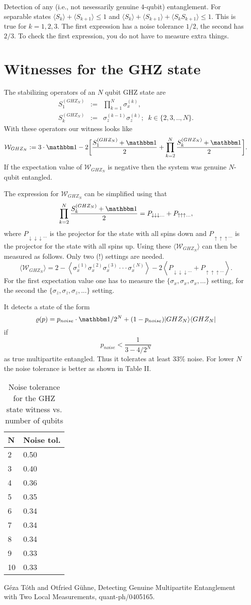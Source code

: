 \documentclass[amsmath,amssymb]{revtex4}
\newcommand{\be}{\begin{equation}}
\newcommand{\ee}{\end{equation}}
\newcommand{\eea}{\end{eqnarray}}
\newcommand{\bea}{\begin{eqnarray}}
\newcommand{\ex}[1]{\ensuremath{\left\langle{#1}\right\rangle}}
\newcommand{\exs}[1]{\ensuremath{\langle{#1}\rangle}}
\newcommand{\eins}{\ensuremath{\mathbbm 1}}
\newcommand{\WW}{\ensuremath{\mathcal{W}}}
\newcommand{\ketbra}[1]{\ensuremath{| #1 \rangle \langle #1 |}}
\begin{document}
Detection of any (i.e., not nesessarily genuine 4-qubit)
entanglement.
For separable states $\exs{S_k}+\exs{S_{k+1}}\le 1$ and 
$\exs{S_k}+\exs{S_{k+1}}+\exs{S_kS_{k+1}}\le 1$.
This is true for $k=1,2,3$. The first 
expression has a noise tolerance $1/2$, the second has $2/3$.
To check the first expression, you do not have to measure extra
things.

\section{Witnesses for the GHZ state}

The stabilizing operators of an $N$ qubit GHZ state are \bea
S_1^{(GHZ_N)}&:=& \prod_{k=1}^N \sigma_x^{(k)},
\nonumber\\
S_k^{(GHZ_N)}&:=&\sigma_z^{(k-1)} \sigma_z^{(k)}; \;\;
k\in\{2,3,..,N\}. \label{eigenGHZ} \eea With these operators our
witness looks like \be \WW_{GHZ_N} :=
3\cdot\eins-2\bigg[\frac{S_1^{(GHZ_N)}+\eins}{2}
+\prod_{k=2}^N\frac{S_k^{(GHZ_N)}+\eins}{2}\bigg].
\label{wnoisetol} \nonumber \ee If the expectation value of
$\WW_{GHZ_N}$ is negative then the system was genuine $N$-qubit
entangled.

The expression for $\WW_{GHZ_N}$ can be simplified using that \be
\prod_{k=2}^N\frac{S_k^{(GHZ_N)}+\eins}{2}= P_{\downarrow
\downarrow\downarrow ...}+ P_{\uparrow \uparrow\uparrow ...}, \ee
where $P_{\downarrow \downarrow\downarrow ...}$ is the projector
for  the state with all spins down and $P_{\uparrow
\uparrow\uparrow ...}$ is the projector for the state with all
spins up. Using these $\exs{\WW_{GHZ_N}}$ can then be measured as
follows. Only two (!) settings are needed. \be \exs{\WW_{GHZ_N}} =
2-\ex{\sigma_x^{(1)}\sigma_x^{(2)}\sigma_x^{(3)} \cdot \cdot \cdot
\sigma_x^{(N)}} -2\ex{ P_{\downarrow \downarrow\downarrow ...}+
P_{\uparrow \uparrow\uparrow ...}}. \label{wnoisetol2} \ee For the
first expectation value one has to measure the
$\{\sigma_x,\sigma_x,\sigma_x,...\}$ setting, for the second the
$\{\sigma_z,\sigma_z,\sigma_z,...\}$ setting.

It detects a state of the form \be \varrho(p)=p_{noise} \cdot
\eins / 2^N + (1-p_{noise}) \ketbra{GHZ_N} \ee if \be
p_{noise}<\frac{1}{3-4/2^N} \ee as true multipartite entangled.
Thus it tolerates at least $33\%$ noise. For lower $N$ the noise
tolerance is better as shown in Table II.

\begin{table}
\caption{Noise tolerance for the GHZ state witness vs. number of
qubits}
\begin{tabular}{l|l}
N &  Noise tol.\\ \hline
2 &  0.50 \\
3 &  0.40 \\
4 &  0.36 \\
5 &  0.35 \\
6 &  0.34 \\
7 &  0.34 \\
8 &  0.34 \\
9 &  0.33 \\
10 & 0.33 \\
\end{tabular}
\end{table}

\begin{thebibliography}{99}
G\'eza T\'oth and Otfried G\"uhne,
Detecting Genuine Multipartite Entanglement
with Two Local Measurements, quant-ph/0405165.
\end{thebibliography}
\end{document}
